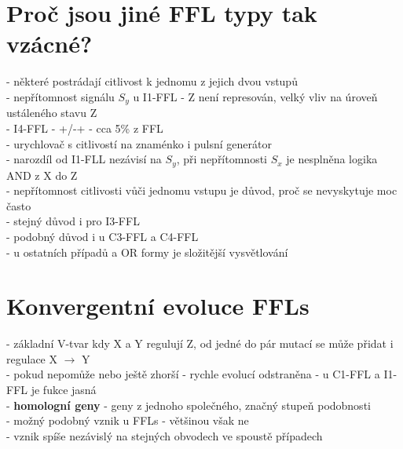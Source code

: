 \documentclass[11pt,a4paper]{report}
\begin{document}
\section{Proč jsou jiné FFL typy tak vzácné?}
- některé postrádají citlivost k jednomu z jejich dvou vstupů\\
- nepřítomnost signálu $S_y$ u I1-FFL - Z není represován, velký vliv na úroveň ustáleného stavu Z\\
- I4-FFL - +/-+ - cca 5\% z FFL\\
\indent - urychlovač s citlivostí na znaménko i pulsní generátor\\
\indent - narozdíl od I1-FLL nezávisí na $S_y$, při nepřítomnosti $S_x$ je nesplněna logika AND z X do Z\\
\indent \indent - nepřítomnost citlivosti vůči jednomu vstupu je důvod, proč se nevyskytuje moc často\\
\indent \indent \indent - stejný důvod i pro I3-FFL\\
\indent \indent \indent - podobný důvod i u C3-FFL a C4-FFL\\
\indent \indent \indent - u ostatních případů a OR formy je složitější vysvětlování\\

\section{Konvergentní evoluce FFLs}
- základní V-tvar kdy X a Y regulují Z, od jedné do pár mutací se může přidat i regulace X $\rightarrow$ Y\\
\indent - pokud nepomůže nebo ještě zhorší - rychle evolucí odstraněna
\indent - u C1-FFL a I1-FFL je fukce jasná\\
- \textbf{homologní geny} - geny z jednoho společného, značný stupeň podobnosti\\
\indent - možný podobný vznik u FFLs - většinou však ne\\
- vznik spíše nezávislý na stejných obvodech ve spoustě případech
\end{document}
